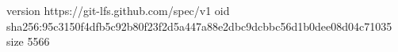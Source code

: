version https://git-lfs.github.com/spec/v1
oid sha256:95c3150f4dfb5c92b80f23f2d5a447a88e2dbc9dcbbc56d1b0dee08d04c71035
size 5566
